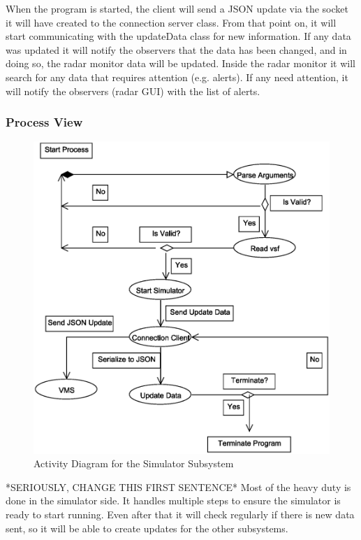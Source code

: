 \documentclass{article}
\begin{document}
When the program is started, the client will send a JSON update via the socket it will have created to the connection server class. From that point on, it will start communicating with the updateData class for new information. If any data was updated it will notify the observers that the data has been changed, and in doing so, the radar monitor data will be updated. Inside the radar monitor it will search for any data that requires attention (e.g. alerts). If any need attention, it will notify the observers (radar GUI) with the list of alerts.

\subsubsection{Process View} %

\begin{figure}[!htb]
\caption{Activity Diagram for the Simulator Subsystem}
\centering
\includegraphics[scale=0.35]{diagrams/simulator-acitivity-diagram.eps}
\end{figure}

*SERIOUSLY, CHANGE THIS FIRST SENTENCE*
Most of the heavy duty is done in the simulator side. It handles multiple steps to ensure the simulator is ready to start running. Even after that it will check regularly if there is new data sent, so it will be able to create updates for the other subsystems.
\end{document}
